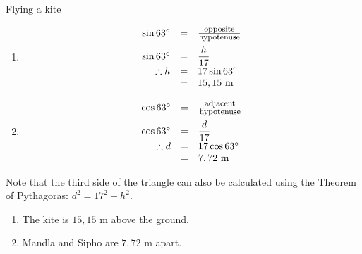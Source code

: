 \begin{wex}{Flying a kite}
{
\begin{enumerate}[noitemsep, label=\textbf{\arabic*}. ] 
\item
\begin{equation*}
 \begin{array}{ccl}
\hfill \sin 63^{\circ} &= & \frac{\mbox{\footnotesize opposite}}{\mbox{\footnotesize hypotenuse}} \hfill \vspace{5pt}\\
\hfill \sin 63^{\circ} &=& \dfrac{h}{17} \hfill \\
\hfill \therefore h &= & 17 \sin 63^{\circ} \hfill \\
\hfill &=& 15,15~\mbox{m} \hfill \\
   \end{array}
\end{equation*}

\item
\begin{equation*}
 \begin{array}{ccl}
\hfill \cos 63^{\circ} &= & \frac{\mbox{\footnotesize adjacent}}{\mbox{\footnotesize hypotenuse}} \hfill \vspace{5pt}\\
\hfill \cos 63^{\circ} &=& \dfrac{d}{17} \hfill \\
\hfill \therefore d &= & 17 \cos 63^{\circ} \hfill \\
\hfill  &=& 7,72~\mbox{m} \hfill \\
\end{array}
\end{equation*}
\end{enumerate}
Note that the third side of the triangle can also be calculated using the Theorem of Pythagoras: $d^{2} = 17^{2} - h^{2}$.

\begin{enumerate}[noitemsep, label=\textbf{\arabic*}. ] 
\item The kite is $15,15$ m above the ground.
\item Mandla and Sipho are $7,72$ m apart.
\end{enumerate}
}
\end{wex}

